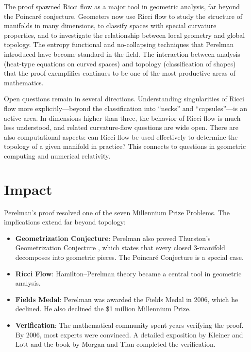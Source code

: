 The proof spawned Ricci flow as a major tool in geometric analysis, far beyond the Poincar\'e conjecture. Geometers now use Ricci flow to study the structure of manifolds in many dimensions, to classify spaces with special curvature properties, and to investigate the relationship between local geometry and global topology. The entropy functional and no-collapsing techniques that Perelman introduced have become standard in the field. The interaction between analysis (heat-type equations on curved spaces) and topology (classification of shapes) that the proof exemplifies continues to be one of the most productive areas of mathematics.

Open questions remain in several directions. Understanding singularities of Ricci flow more explicitly---beyond the classification into ``necks'' and ``capsules''---is an active area. In dimensions higher than three, the behavior of Ricci flow is much less understood, and related curvature-flow questions are wide open. There are also computational aspects: can Ricci flow be used effectively to determine the topology of a given manifold in practice? This connects to questions in geometric computing and numerical relativity.

\section{Impact}

Perelman's proof resolved one of the seven Millennium Prize Problems. The implications extend far beyond topology:

\begin{itemize}
\item \textbf{Geometrization Conjecture}: Perelman also proved Thurston's Geometrization Conjecture \cite{thurston1982}, which states that every closed 3-manifold decomposes into geometric pieces. The Poincar\'e Conjecture is a special case.
\item \textbf{Ricci Flow}: Hamilton--Perelman theory became a central tool in geometric analysis.
\item \textbf{Fields Medal}: Perelman was awarded the Fields Medal in 2006, which he declined. He also declined the \$1 million Millennium Prize.
\item \textbf{Verification}: The mathematical community spent years verifying the proof. By 2006, most experts were convinced. A detailed exposition by Kleiner and Lott \cite{kleiner2008} and the book by Morgan and Tian \cite{morgan2006} completed the verification.
\end{itemize}

